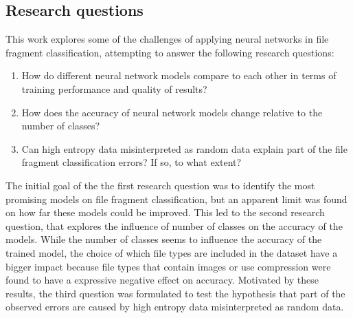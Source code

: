 \subsection{Research questions}
This work explores some of the challenges of applying neural networks in file fragment classification, attempting to answer the following research questions:

\begin{enumerate}[itemindent=\parindent,label=\textbf{Q\arabic*.}]

    \item How do different neural network models compare to each other in terms of training performance and quality of results?
    
    \item How does the accuracy of neural network models change relative to the number of classes?

    \item Can high entropy data misinterpreted as random data explain part of the file fragment classification errors? If so, to what extent?
\end{enumerate}

The initial goal of the the first research question was to identify the most promising models on file fragment classification, but an apparent limit was found on how far these models could be improved. This led to the second research question, that explores the influence of number of classes on the accuracy of the models. While the number of classes seems to influence the accuracy of the trained model, the choice of which file types are included in the dataset have a bigger impact because file types that contain images or use compression were found to have a expressive negative effect on accuracy. Motivated by these results, the third question was formulated to test the hypothesis that part of the observed errors are caused by high entropy data misinterpreted as random data.



